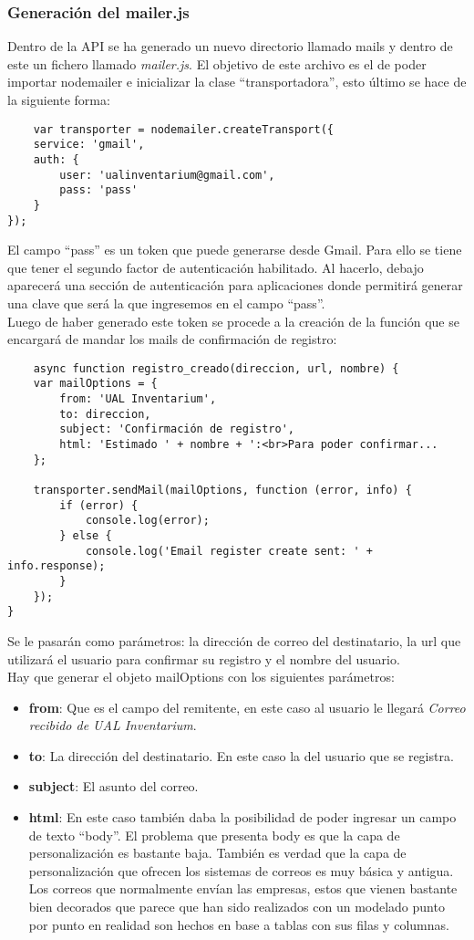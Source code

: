 \subsubsection{Generación del mailer.js}
Dentro de la API se ha generado un nuevo directorio llamado mails y dentro de este un fichero llamado \textit{mailer.js}. El objetivo de este archivo es el de poder importar nodemailer e inicializar la clase ``transportadora'', esto último se hace de la siguiente forma:
\begin{verbatim}
    var transporter = nodemailer.createTransport({
    service: 'gmail',
    auth: {
        user: 'ualinventarium@gmail.com',
        pass: 'pass'
    }
});
\end{verbatim}
El campo ``pass'' es un token que puede generarse desde Gmail. Para ello se tiene que tener el segundo factor de autenticación habilitado. Al hacerlo, debajo aparecerá una sección de autenticación para aplicaciones donde permitirá generar una clave que será la que ingresemos en el campo ``pass''.
\\Luego de haber generado este token se procede a la creación de la función que se encargará de mandar los mails de confirmación de registro:
\begin{verbatim}
    async function registro_creado(direccion, url, nombre) {
    var mailOptions = {
        from: 'UAL Inventarium',
        to: direccion,
        subject: 'Confirmación de registro',
        html: 'Estimado ' + nombre + ':<br>Para poder confirmar...
    };

    transporter.sendMail(mailOptions, function (error, info) {
        if (error) {
            console.log(error);
        } else {
            console.log('Email register create sent: ' + info.response);
        }
    });
}
\end{verbatim}
Se le pasarán como parámetros: la dirección de correo del destinatario, la url que utilizará el usuario para confirmar su registro y el nombre del usuario.
\\Hay que generar el objeto mailOptions con los siguientes parámetros:
\begin{itemize}
    \item \textbf{from}: Que es el campo del remitente, en este caso al usuario le llegará \textit{Correo recibido de UAL Inventarium}.
    \item \textbf{to}: La dirección del destinatario. En este caso la del usuario que se registra.
    \item \textbf{subject}: El asunto del correo.
    \item \textbf{html}: En este caso también daba la posibilidad de poder ingresar un campo de texto ``body''. El problema que presenta body es que la capa de personalización es bastante baja. También es verdad que la capa de personalización que ofrecen los sistemas de correos es muy básica y antigua. Los correos que normalmente envían las empresas, estos que vienen bastante bien decorados que parece que han sido realizados con un modelado punto por punto en realidad son hechos en base a tablas con sus filas y columnas.
\end{itemize}
